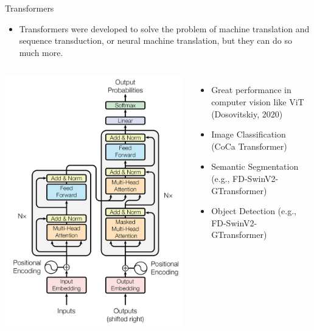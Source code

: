 \documentclass{beamer}
\begin{document}
\begin{frame}{Transformers}
\begin{itemize}
    \item Transformers were developed to solve the problem of machine translation and sequence transduction, or neural machine translation, but they can do so much more.
\end{itemize}

\begin{columns}
  \includegraphics[width=1\linewidth]{f3.png} %

      \begin{itemize}
          \item Great performance in computer vision like ViT (Dosovitskiy, 2020)
          \item Image Classification (CoCa Transformer)
          \item Semantic Segmentation (e.g., FD-SwinV2-GTransformer)
          \item Object Detection (e.g., FD-SwinV2-GTransformer)
      \end{itemize}

\end{columns}
\end{frame}
\end{document}
